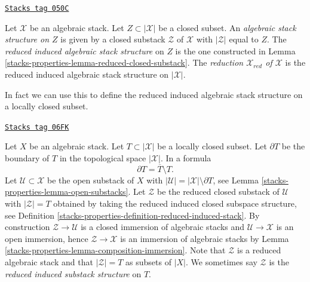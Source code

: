 \begin{definition}
\label{stacks-properties-definition-reduced-induced-stack}
\href{https://stacks.math.columbia.edu/tag/050C}{\texttt{Stacks tag 050C}}

Let $\mathcal{X}$ be an algebraic stack.
Let $Z \subset |\mathcal{X}|$ be a closed subset.
An {\it algebraic stack structure on $Z$} is given by a closed substack
$\mathcal{Z}$ of $\mathcal{X}$ with $|\mathcal{Z}|$ equal to $Z$.
The {\it reduced induced algebraic stack structure}
on $Z$ is the one constructed in
Lemma \ref{stacks-properties-lemma-reduced-closed-substack}.
The {\it reduction $\mathcal{X}_{red}$ of $\mathcal{X}$}
is the reduced induced algebraic stack structure on $|\mathcal{X}|$.
\end{definition}

In fact we can use this to define the reduced induced algebraic
stack structure on a locally closed subset.

\begin{remark}
\label{stacks-properties-remark-stack-structure-locally-closed-subset}
\href{https://stacks.math.columbia.edu/tag/06FK}{\texttt{Stacks tag 06FK}}

Let $X$ be an algebraic stack.
Let $T \subset |\mathcal{X}|$ be a locally closed subset.
Let $\partial T$ be the boundary of $T$ in
the topological space $|\mathcal{X}|$. In a formula
$$
\partial T = \overline{T} \setminus T.
$$
Let $\mathcal{U} \subset \mathcal{X}$ be the open substack of $X$ with
$|\mathcal{U}| = |\mathcal{X}| \setminus \partial T$, see
Lemma \ref{stacks-properties-lemma-open-substacks}.
Let $\mathcal{Z}$ be the reduced closed substack of $\mathcal{U}$ with
$|\mathcal{Z}| = T$ obtained by taking the reduced induced
closed subspace structure, see
Definition \ref{stacks-properties-definition-reduced-induced-stack}.
By construction $\mathcal{Z} \to \mathcal{U}$ is a closed immersion of
algebraic stacks and $\mathcal{U} \to \mathcal{X}$ is an open immersion,
hence $\mathcal{Z} \to \mathcal{X}$ is an immersion of algebraic stacks by
Lemma \ref{stacks-properties-lemma-composition-immersion}.
Note that $\mathcal{Z}$ is a reduced algebraic stack and that
$|\mathcal{Z}| = T$ as subsets of $|X|$. We sometimes say
$\mathcal{Z}$ is the {\it reduced induced substack structure} on $T$.
\end{remark}

